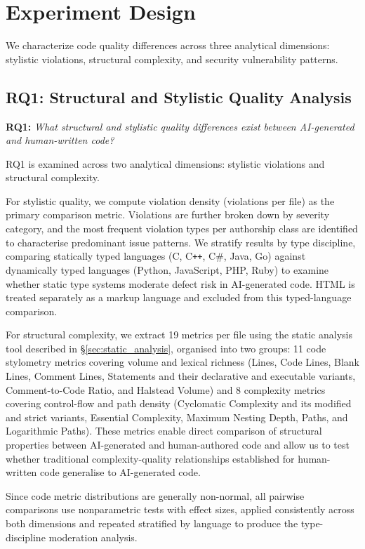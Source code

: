 \section{Experiment Design}
\label{sec:study_design}
We characterize code quality differences across three analytical dimensions: stylistic violations, structural complexity, and security vulnerability patterns.

\subsection{RQ1: Structural and Stylistic Quality Analysis}

\noindent \textbf{RQ1:} \textit{What structural and stylistic quality differences exist between AI-generated and human-written code?}

RQ1 is examined across two analytical dimensions: stylistic violations and structural complexity.

For stylistic quality, we compute violation density (violations per file) as the primary comparison metric. Violations are further broken down by severity category, and the most frequent violation types per authorship class are identified to characterise predominant issue patterns. We stratify results by type discipline, comparing statically typed languages (C, C\texttt{++}, C\#, Java, Go) against dynamically typed languages (Python, JavaScript, PHP, Ruby) to examine whether static type systems moderate defect risk in AI-generated code. HTML is treated separately as a markup language and excluded from this typed-language comparison.

For structural complexity, we extract 19 metrics per file using the static analysis tool described in \S\ref{sec:static_analysis}, organised into two groups: 11 code stylometry metrics covering volume and lexical richness (Lines, Code Lines, Blank Lines, Comment Lines, Statements and their declarative and executable variants, Comment-to-Code Ratio, and Halstead Volume) and 8 complexity metrics covering control-flow and path density (Cyclomatic Complexity and its modified and strict variants, Essential Complexity, Maximum Nesting Depth, Paths, and Logarithmic Paths). These metrics enable direct comparison of structural properties between AI-generated and human-authored code and allow us to test whether traditional complexity-quality relationships established for human-written code generalise to AI-generated code.

Since code metric distributions are generally non-normal, all pairwise comparisons use nonparametric tests with effect sizes, applied consistently across both dimensions and repeated stratified by language to produce the type-discipline moderation analysis.


